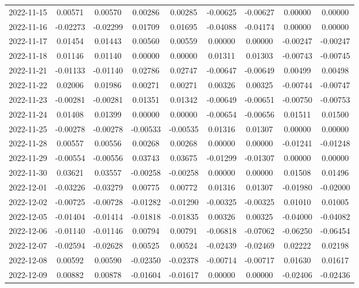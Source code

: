{\begin{footnotesize}
\begin{longtable}{lcccccccc}
2022-11-15 & 0.00571 & 0.00570 & 0.00286 & 0.00285 & -0.00625 & -0.00627 & 0.00000 & 0.00000 \\
2022-11-16 & -0.02273 & -0.02299 & 0.01709 & 0.01695 & -0.04088 & -0.04174 & 0.00000 & 0.00000 \\
2022-11-17 & 0.01454 & 0.01443 & 0.00560 & 0.00559 & 0.00000 & 0.00000 & -0.00247 & -0.00247 \\
2022-11-18 & 0.01146 & 0.01140 & 0.00000 & 0.00000 & 0.01311 & 0.01303 & -0.00743 & -0.00745 \\
2022-11-21 & -0.01133 & -0.01140 & 0.02786 & 0.02747 & -0.00647 & -0.00649 & 0.00499 & 0.00498 \\
2022-11-22 & 0.02006 & 0.01986 & 0.00271 & 0.00271 & 0.00326 & 0.00325 & -0.00744 & -0.00747 \\
2022-11-23 & -0.00281 & -0.00281 & 0.01351 & 0.01342 & -0.00649 & -0.00651 & -0.00750 & -0.00753 \\
2022-11-24 & 0.01408 & 0.01399 & 0.00000 & 0.00000 & -0.00654 & -0.00656 & 0.01511 & 0.01500 \\
2022-11-25 & -0.00278 & -0.00278 & -0.00533 & -0.00535 & 0.01316 & 0.01307 & 0.00000 & 0.00000 \\
2022-11-28 & 0.00557 & 0.00556 & 0.00268 & 0.00268 & 0.00000 & 0.00000 & -0.01241 & -0.01248 \\
2022-11-29 & -0.00554 & -0.00556 & 0.03743 & 0.03675 & -0.01299 & -0.01307 & 0.00000 & 0.00000 \\
2022-11-30 & 0.03621 & 0.03557 & -0.00258 & -0.00258 & 0.00000 & 0.00000 & 0.01508 & 0.01496 \\
2022-12-01 & -0.03226 & -0.03279 & 0.00775 & 0.00772 & 0.01316 & 0.01307 & -0.01980 & -0.02000 \\
2022-12-02 & -0.00725 & -0.00728 & -0.01282 & -0.01290 & -0.00325 & -0.00325 & 0.01010 & 0.01005 \\
2022-12-05 & -0.01404 & -0.01414 & -0.01818 & -0.01835 & 0.00326 & 0.00325 & -0.04000 & -0.04082 \\
2022-12-06 & -0.01140 & -0.01146 & 0.00794 & 0.00791 & -0.06818 & -0.07062 & -0.06250 & -0.06454 \\
2022-12-07 & -0.02594 & -0.02628 & 0.00525 & 0.00524 & -0.02439 & -0.02469 & 0.02222 & 0.02198 \\
2022-12-08 & 0.00592 & 0.00590 & -0.02350 & -0.02378 & -0.00714 & -0.00717 & 0.01630 & 0.01617 \\
2022-12-09 & 0.00882 & 0.00878 & -0.01604 & -0.01617 & 0.00000 & 0.00000 & -0.02406 & -0.02436 \\

\end{longtable}
\end{footnotesize}}
